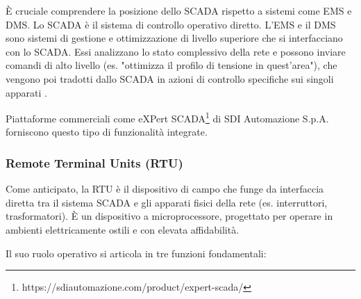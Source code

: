 È cruciale comprendere la posizione dello SCADA rispetto a sistemi come EMS e DMS. Lo SCADA è il sistema di controllo operativo diretto. L'EMS e il DMS sono sistemi di gestione e ottimizzazione di livello superiore che si interfacciano con lo SCADA. Essi analizzano lo stato complessivo della rete e possono inviare comandi di alto livello (es. "ottimizza il profilo di tensione in quest'area"), che vengono poi tradotti dallo SCADA in azioni di controllo specifiche sui singoli apparati \cite{SCADA-SDI}.

Piattaforme commerciali come eXPert SCADA\footnote{https://sdiautomazione.com/product/expert-scada/} di SDI Automazione S.p.A. forniscono questo tipo di funzionalità integrate.


\subsubsection{Remote Terminal Units (RTU)}





Come anticipato, la RTU è il dispositivo di campo che funge da interfaccia diretta tra il sistema SCADA e gli apparati fisici della rete (es. interruttori, trasformatori). È un dispositivo a microprocessore, progettato per operare in ambienti elettricamente ostili e con elevata affidabilità.


Il suo ruolo operativo si articola in tre funzioni fondamentali:


